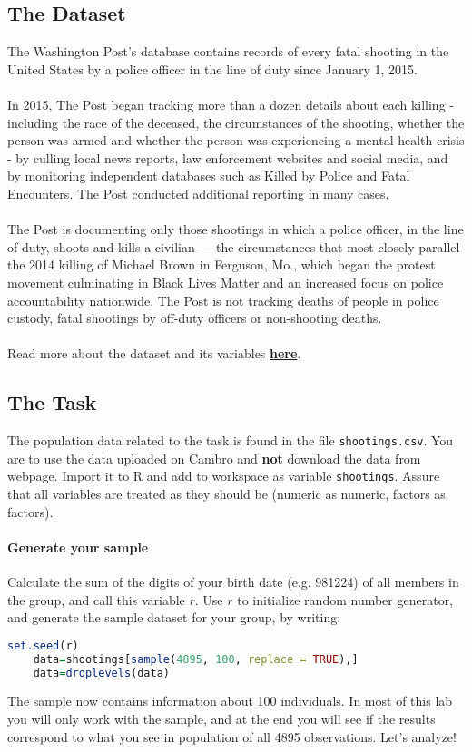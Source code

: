 \documentclass[a4paper, 10pt,serif]{article}
\begin{document}
\subsection*{The Dataset}
The Washington Post's database contains records of every fatal shooting in the United States by a police officer in the line of duty since January 1, 2015. 
\\
\\
\noindent
In 2015, The Post began tracking more than a dozen details about each killing - including the race of the deceased, the circumstances of the shooting, whether the person was armed and whether the person was experiencing a mental-health crisis - by culling local news reports, law enforcement websites and social media, and by monitoring independent databases such as Killed by Police and Fatal Encounters. The Post conducted additional reporting in many cases.
\\
\\
\noindent
The Post is documenting only those shootings in which a police officer, in the line of duty, shoots and kills a civilian — the circumstances that most closely parallel the 2014 killing of Michael Brown in Ferguson, Mo., which began the protest movement culminating in Black Lives Matter and an increased focus on police accountability nationwide. The Post is not tracking deaths of people in police custody, fatal shootings by off-duty officers or non-shooting deaths. 
\\
\\
\noindent
Read more about the dataset and its variables \href{https://github.com/washingtonpost/data-police-shootings}{\textbf{here}}.

\subsection*{The Task}
The population data related to the task is found in the file \texttt{shootings.csv}. You are to use the data uploaded on Cambro and \textbf{not} download the data from webpage. Import it to R and add to workspace as variable \texttt{shootings}. Assure that all variables are treated as they should be (numeric as numeric, factors as factors). 

\paragraph{Generate your sample} Calculate the sum of the digits of your birth date (e.g. 981224) of all members in the group, and call this variable $r$. Use $r$ to initialize random number generator, and generate the sample dataset for your group, by writing:
\begin{lstlisting}[language=R]
    set.seed(r)
    data=shootings[sample(4895, 100, replace = TRUE),]
    data=droplevels(data)
\end{lstlisting}
The sample now contains information about 100 individuals. In most of this lab you will only work with the sample, and at the end you will see if the results correspond to what you see in population of all 4895 observations. Let's analyze!
\end{document}
